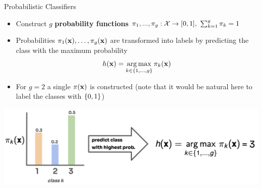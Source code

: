 \documentclass[11pt,compress,t,notes=noshow, xcolor=table]{beamer}
\begin{document}
\begin{vbframe}{Probabilistic Classifiers}
\begin{itemize}
\item Construct $g$ \textbf{probability functions} $\pi_1, ..., \pi_g: \Xspace \to [0, 1],~\sum_{k = 1}^g \pi_k = 1$ 
\item Probabilities $\pi_1(\xv), \ldots, \pikx[g]$ are transformed into labels by predicting the class with the maximum probability
$$
\hx = \argmax_{k \in \gset} \pikx
$$ 
\item For $g = 2$ a single $\pix$ is constructed (note that it would be natural here to label the classes with $\setzo$)
\end{itemize}


\begin{center}
  \includegraphics{figure_man/probabilities.png} 
\end{center}
\end{vbframe}
\end{document}
